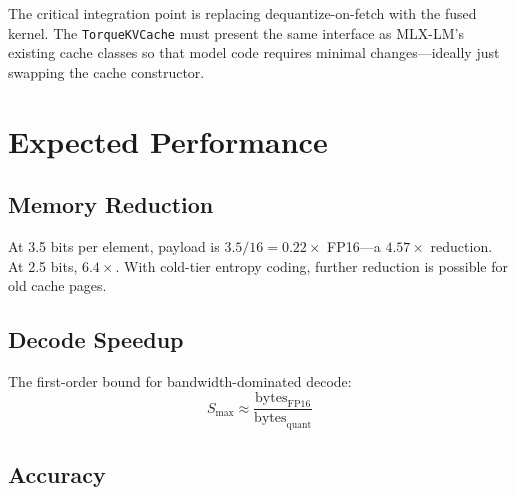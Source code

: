 \documentclass[nobib]{tufte-handout}
\begin{document}
The critical integration point is replacing dequantize-on-fetch with the fused kernel. The \texttt{TorqueKVCache} must present the same interface as MLX-LM's existing cache classes so that model code requires minimal changes---ideally just swapping the cache constructor.


\section{Expected Performance}

\subsection{Memory Reduction}

At 3.5 bits per element, payload is $3.5/16 = 0.22\times$ FP16---a $4.57\times$ reduction. At 2.5 bits, $6.4\times$. With cold-tier entropy coding, further reduction is possible for old cache pages.

\subsection{Decode Speedup}

The first-order bound for bandwidth-dominated decode:
\[
  S_{\max} \approx \frac{\mathrm{bytes}_{\mathrm{FP16}}}{\mathrm{bytes}_{\mathrm{quant}}}
\]


\subsection{Accuracy}
\end{document}
